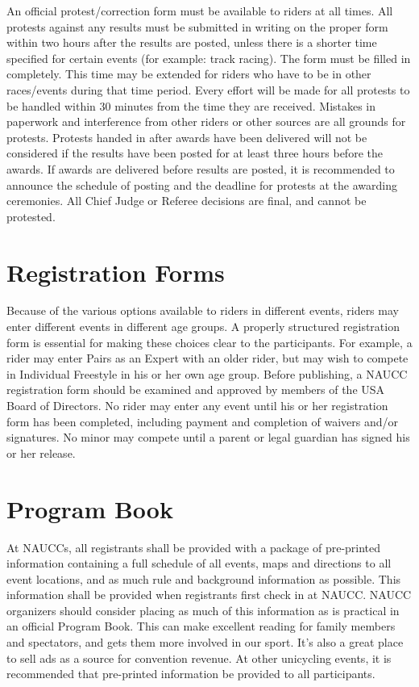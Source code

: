 An official protest/correction form must be available to riders at all times.
All protests against any results must be submitted in writing on the proper form within two hours after the results are posted, unless there is a shorter time specified for certain events (for example: track racing).
The form must be filled in completely.
This time may be extended for riders who have to be in other races/events during that time period.
Every effort will be made for all protests to be handled within 30 minutes from the time they are received.
Mistakes in paperwork and interference from other riders or other sources are all grounds for protests.
Protests handed in after awards have been delivered will not be considered if the results have been posted for at least three hours before the awards.
If awards are delivered before results are posted, it is recommended to announce the schedule of posting and the deadline for protests at the awarding ceremonies.
All Chief Judge or Referee decisions are final, and cannot be protested.

\section{Registration Forms}
Because of the various options available to riders in different events, riders may enter different events in different age groups.
A properly structured registration form is essential for making these choices clear to the participants.
For example, a rider may enter Pairs as an Expert with an older rider, but may wish to compete in Individual Freestyle in his or her own age group.
Before publishing, a NAUCC registration form should be examined and approved by members of the USA Board of Directors.
No rider may enter any event until his or her registration form has been completed, including payment and completion of waivers and/or signatures.
No minor may compete until a parent or legal guardian has signed his or her release.

\section{Program Book}
At NAUCCs, all registrants shall be provided with a package of pre-printed information containing a full schedule of all events, maps and directions to all event locations, and as much rule and background information as possible.
This information shall be provided when registrants first check in at NAUCC.
NAUCC organizers should consider placing as much of this information as is practical in an official Program Book.
This can make excellent reading for family members and spectators, and gets them more involved in our sport.
It's also a great place to sell ads as a source for convention revenue.
At other unicycling events, it is recommended that pre-printed information be provided to all participants.

